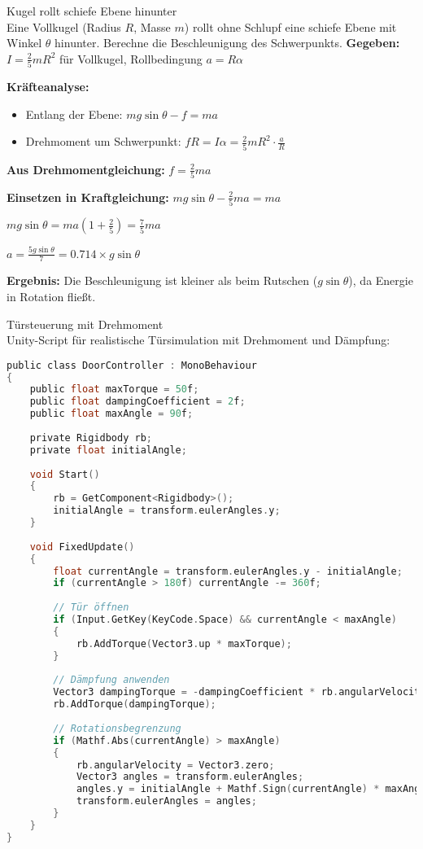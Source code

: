 \begin{example2}{Kugel rollt schiefe Ebene hinunter}\\
    Eine Vollkugel (Radius $R$, Masse $m$) rollt ohne Schlupf eine schiefe Ebene mit Winkel $\theta$ hinunter. Berechne die Beschleunigung des Schwerpunkts.
    \tcblower
    \textbf{Gegeben:} $I = \frac{2}{5}mR^2$ für Vollkugel, Rollbedingung $a = R\alpha$
    
    \textbf{Kräfteanalyse:}
    \begin{itemize}
        \item Entlang der Ebene: $mg\sin\theta - f = ma$
        \item Drehmoment um Schwerpunkt: $fR = I\alpha = \frac{2}{5}mR^2 \cdot \frac{a}{R}$
    \end{itemize}
    
    \textbf{Aus Drehmomentgleichung:} $f = \frac{2}{5}ma$
    
    \textbf{Einsetzen in Kraftgleichung:}
    $mg\sin\theta - \frac{2}{5}ma = ma$
    
    $mg\sin\theta = ma(1 + \frac{2}{5}) = \frac{7}{5}ma$
    
    $a = \frac{5g\sin\theta}{7} = 0.714 \times g\sin\theta$
    
    \textbf{Ergebnis:} Die Beschleunigung ist kleiner als beim Rutschen ($g\sin\theta$), da Energie in Rotation fließt.
\end{example2}

\begin{example2}{Türsteuerung mit Drehmoment}\\
    Unity-Script für realistische Türsimulation mit Drehmoment und Dämpfung:
    \tcblower
\begin{lstlisting}[language=C, style=basesmol]
public class DoorController : MonoBehaviour 
{
    public float maxTorque = 50f;
    public float dampingCoefficient = 2f;
    public float maxAngle = 90f;
    
    private Rigidbody rb;
    private float initialAngle;
    
    void Start() 
    {
        rb = GetComponent<Rigidbody>();
        initialAngle = transform.eulerAngles.y;
    }
    
    void FixedUpdate() 
    {
        float currentAngle = transform.eulerAngles.y - initialAngle;
        if (currentAngle > 180f) currentAngle -= 360f;
        
        // Tür öffnen
        if (Input.GetKey(KeyCode.Space) && currentAngle < maxAngle) 
        {
            rb.AddTorque(Vector3.up * maxTorque);
        }
        
        // Dämpfung anwenden
        Vector3 dampingTorque = -dampingCoefficient * rb.angularVelocity;
        rb.AddTorque(dampingTorque);
        
        // Rotationsbegrenzung
        if (Mathf.Abs(currentAngle) > maxAngle) 
        {
            rb.angularVelocity = Vector3.zero;
            Vector3 angles = transform.eulerAngles;
            angles.y = initialAngle + Mathf.Sign(currentAngle) * maxAngle;
            transform.eulerAngles = angles;
        }
    }
}
\end{lstlisting}
\end{example2}

